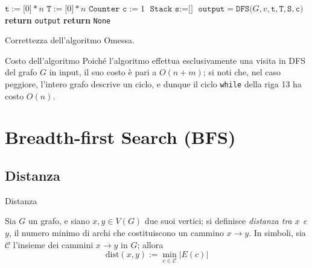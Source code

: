 \documentclass[a4paper, 12pt]{report}
\begin{document}
    \begin{nocaptionalg}
        \begin{algorithmic}[1]
                \State $\texttt{t} := \texttt{[}0\texttt{]} * n$
                \State $\texttt{T} := \texttt{[}0\texttt{]} * n$
                \State $\texttt{Counter c} := 1$
                \State $\texttt{Stack s} := \texttt{[]}$
                        \State $\texttt{output} = \texttt{DFS(}G, v, \texttt{t}, \texttt{T}, \texttt{S}, \texttt{c)}$
                            \State \textbf{return} \texttt{output}
                        \EndIf
                    \EndIf
                \EndFor
                \State \textbf{return} \texttt{None}
            \EndFunction
        \end{algorithmic}
    \end{nocaptionalg}

    \begin{framedobs}{Correttezza dell'algoritmo}
        Omessa.
    \end{framedobs}

    \begin{framedobs}{Costo dell'algoritmo}
        Poiché l'algoritmo effettua esclusivamente una visita in DFS del grafo $G$ in input, il suo costo è pari a $O(n + m)$; si noti che, nel caso peggiore, l'intero grafo descrive un ciclo, e dunque il ciclo \texttt{while} della riga 13 ha costo $O(n)$.
    \end{framedobs}

    \section{Breadth-first Search (BFS)}

    \subsection{Distanza}

    \begin{frameddefn}{Distanza}
        \label{distanza}

        Sia $G$ un grafo, e siano $x, y \in V(G)$ due suoi vertici; si definisce \textit{distanza tra $x$ e $y$}, il numero minimo di archi che costituiscono un cammino $x \rightarrow y$. In simboli, sia $\mathcal{C}$ l'insieme dei cammini $x \rightarrow y$ in $G$; allora $$\mathrm{dist}(x, y) := \min_{c \in \mathcal{C}}{\left |E(c) \right|}$$
    \end{frameddefn}
\end{document}
